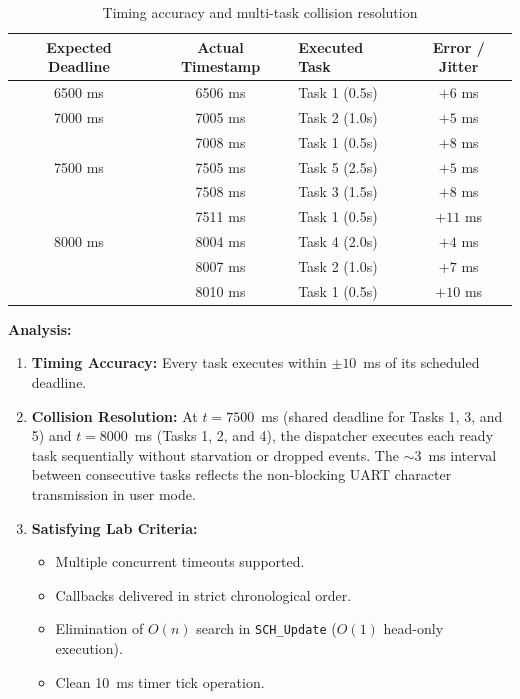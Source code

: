 \documentclass[12pt,a4paper]{article}
\begin{document}
\begin{table}[H]
\centering
\small
\begin{tabular}{|c|c|l|c|}
\hline
\textbf{Expected Deadline} & \textbf{Actual Timestamp} & \textbf{Executed Task} & \textbf{Error / Jitter} \\ \hline
6500 ms & 6506 ms & Task 1 (0.5s) & $+6$ ms \\ \hline
7000 ms & 7005 ms & Task 2 (1.0s) & $+5$ ms \\ 
        & 7008 ms & Task 1 (0.5s) & $+8$ ms \\ \hline
7500 ms & 7505 ms & Task 5 (2.5s) & $+5$ ms \\ 
        & 7508 ms & Task 3 (1.5s) & $+8$ ms \\ 
        & 7511 ms & Task 1 (0.5s) & $+11$ ms \\ \hline
8000 ms & 8004 ms & Task 4 (2.0s) & $+4$ ms \\ 
        & 8007 ms & Task 2 (1.0s) & $+7$ ms \\ 
        & 8010 ms & Task 1 (0.5s) & $+10$ ms \\ \hline
\end{tabular}
\caption{Timing accuracy and multi-task collision resolution}
\label{tab:results}
\end{table}

\textbf{Analysis:}
\begin{enumerate}
    \item \textbf{Timing Accuracy:} Every task executes within $\pm 10$~ms of its scheduled deadline.
    \item \textbf{Collision Resolution:} At $t = 7500$~ms (shared deadline for Tasks 1, 3, and 5) and $t = 8000$~ms (Tasks 1, 2, and 4), the dispatcher executes each ready task sequentially without starvation or dropped events. The $\sim 3$~ms interval between consecutive tasks reflects the non-blocking UART character transmission in user mode.
    \item \textbf{Satisfying Lab Criteria:}
    \begin{itemize}
        \item Multiple concurrent timeouts supported.
        \item Callbacks delivered in strict chronological order.
        \item Elimination of $O(n)$ search in \texttt{SCH\_Update} ($O(1)$ head-only execution).
        \item Clean 10~ms timer tick operation.
    \end{itemize}
\end{enumerate}
\end{document}

